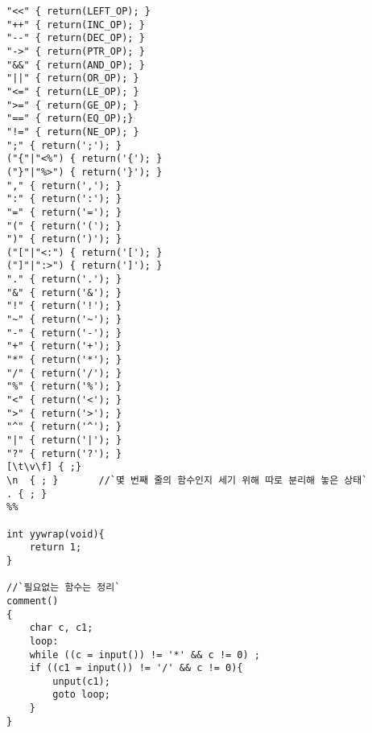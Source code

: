 \documentclass{article}
\begin{document}
\begin{lstlisting}[escapeinside=``]
"<<" { return(LEFT_OP); }
"++" { return(INC_OP); }
"--" { return(DEC_OP); }
"->" { return(PTR_OP); }
"&&" { return(AND_OP); }
"||" { return(OR_OP); }
"<=" { return(LE_OP); }
">=" { return(GE_OP); }
"==" { return(EQ_OP);}
"!=" { return(NE_OP); }
";" { return(';'); }
("{"|"<%") { return('{'); }
("}"|"%>") { return('}'); }
"," { return(','); }
":" { return(':'); }
"=" { return('='); }
"(" { return('('); }
")" { return(')'); }
("["|"<:") { return('['); }
("]"|":>") { return(']'); }
"." { return('.'); }
"&" { return('&'); }
"!" { return('!'); }
"~" { return('~'); }
"-" { return('-'); }
"+" { return('+'); }
"*" { return('*'); }
"/" { return('/'); }
"%" { return('%'); }
"<" { return('<'); }
">" { return('>'); }
"^" { return('^'); }
"|" { return('|'); }
"?" { return('?'); }
[\t\v\f] { ;}
\n	{ ; }       //`몇 번째 줄의 함수인지 세기 위해 따로 분리해 놓은 상태`
. { ; }
%%

int yywrap(void){
	return 1;
}

//`필요없는 함수는 정리`
comment()
{
	char c, c1;
	loop:
	while ((c = input()) != '*' && c != 0) ;
	if ((c1 = input()) != '/' && c != 0){
		unput(c1);
		goto loop;
	}
}


\end{lstlisting}
\end{document}
